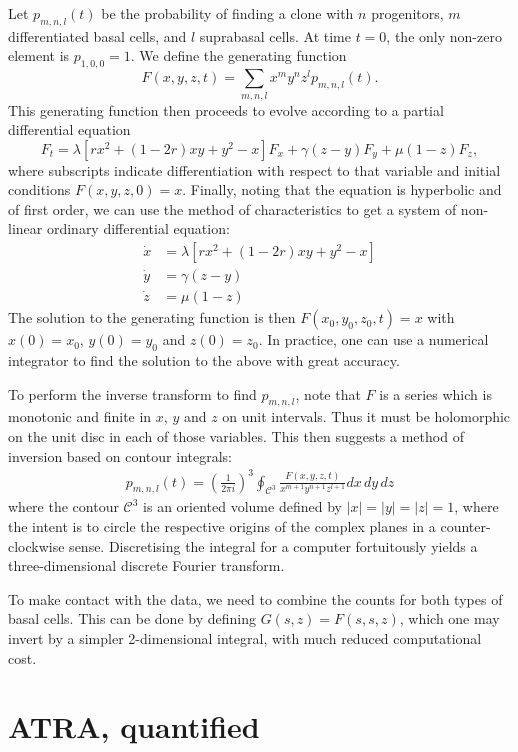 \documentclass[10pt,UKenglish]{article}
\begin{document}
Let $p_{m,n,l}(t)$ be the probability of finding a clone with $n$ progenitors,
$m$ differentiated basal cells, and $l$ suprabasal cells. At time $t=0$, the
only non-zero element is $p_{1,0,0} = 1$. We define the generating function
$$F(x,y,z,t) = \sum_{m,n,l} x^m y^n z^l p_{m,n,l}(t).$$ This generating function
then proceeds to evolve according to a partial differential equation $$F_t =
\lambda \left[r x^2 + (1-2r) x y + y^2 - x \right] F_x + \gamma \left(z - y
\right) F_y + \mu \left(1-z \right) F_z,$$ where subscripts indicate
differentiation with respect to that variable and initial conditions
$F(x,y,z,0)=x$. Finally, noting that the equation is hyperbolic and of first
order, we can use the method of characteristics to get a system of non-linear
ordinary differential equation:
\begin{align*}
\dot x &= \lambda \left[r x^2 + (1-2r) x y + y^2 - x \right] \\
\dot y &= \gamma \left(z - y \right) \\
\dot z &= \mu \left(1-z \right)
\end{align*}
The solution to the generating function is then $F(x_0,y_0,z_0,t) = x$ with
$x(0) = x_0$, $y(0) = y_0$ and $z(0) = z_0$. In practice, one can use a
numerical integrator to find the solution to the above with great accuracy.

To perform the inverse transform to find $p_{m,n,l}$, note that $F$ is a series which is monotonic and finite in $x$, $y$ and $z$ on unit intervals. Thus it must be holomorphic on the unit disc in each of those variables. This then suggests a method of inversion based on contour integrals:
\begin{align*}
p_{m,n,l}(t) = \left(\frac{1}{2\pi i}\right)^3 \oint_{\mathcal{C}^3} \frac{F(x,y,z,t)}{x^{m+1} y^{n+1} z^{l+1}} dx\,dy\,dz
\end{align*}
where the contour $\mathcal{C}^3$ is an oriented volume defined by $|x|=|y|=|z|=1$, where the intent is to circle the respective origins of the complex planes in a counter-clockwise sense. Discretising the integral for a computer fortuitously yields a three-dimensional discrete Fourier transform.

To make contact with the data, we need to combine the counts for both types of basal cells. This can be done by defining $G(s,z) = F(s,s,z)$, which one may invert by a simpler 2-dimensional integral, with much reduced computational cost.

\section{ATRA, quantified}
\end{document}
